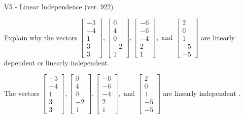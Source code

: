 \begin{exercise}
  \begin{exerciseTitle}V5 - Linear Independence (ver. 922)\end{exerciseTitle}
  \begin{exerciseStatement}
    Explain why the vectors \(\left[\begin{array}{r}
-3 \\
-4 \\
1 \\
3 \\
3
\end{array}\right] , \left[\begin{array}{r}
0 \\
4 \\
0 \\
-2 \\
1
\end{array}\right] , \left[\begin{array}{r}
-6 \\
-6 \\
-4 \\
2 \\
1
\end{array}\right] , \text{ and } \left[\begin{array}{r}
2 \\
0 \\
1 \\
-5 \\
-5
\end{array}\right]\) are linearly dependent or linearly independent.	


  \end{exerciseStatement}
  \begin{exerciseAnswer}
   The vectors \(\left[\begin{array}{r}
-3 \\
-4 \\
1 \\
3 \\
3
\end{array}\right] , \left[\begin{array}{r}
0 \\
4 \\
0 \\
-2 \\
1
\end{array}\right] , \left[\begin{array}{r}
-6 \\
-6 \\
-4 \\
2 \\
1
\end{array}\right] , \text{ and } \left[\begin{array}{r}
2 \\
0 \\
1 \\
-5 \\
-5
\end{array}\right]\) are 
  	 linearly independent  .
  


  \end{exerciseAnswer}
\end{exercise}
